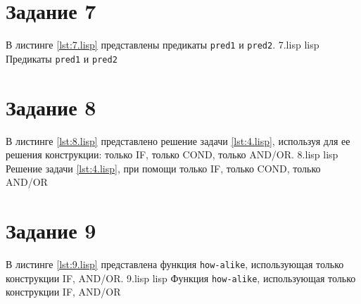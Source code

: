\section{Задание 7}
В листинге \ref{lst:7.lisp} представлены предикаты \texttt{pred1} и \texttt{pred2}.
{7.lisp}
{lisp}
{Предикаты \texttt{pred1} и \texttt{pred2}}

\section{Задание 8}
В листинге \ref{lst:8.lisp} представлено решение задачи \ref{lst:4.lisp}, используя для ее решения конструкции: только IF, только COND, только AND/OR.
{8.lisp}
{lisp}
{Решение задачи \ref{lst:4.lisp}, при помощи только IF, только COND, только AND/OR}

\section{Задание 9}
В листинге \ref{lst:9.lisp} представлена функция \texttt{how-alike}, использующая только конструкции IF, AND/OR.
{9.lisp}
{lisp}
{Функция \texttt{how-alike}, использующая только конструкции IF, AND/OR}

